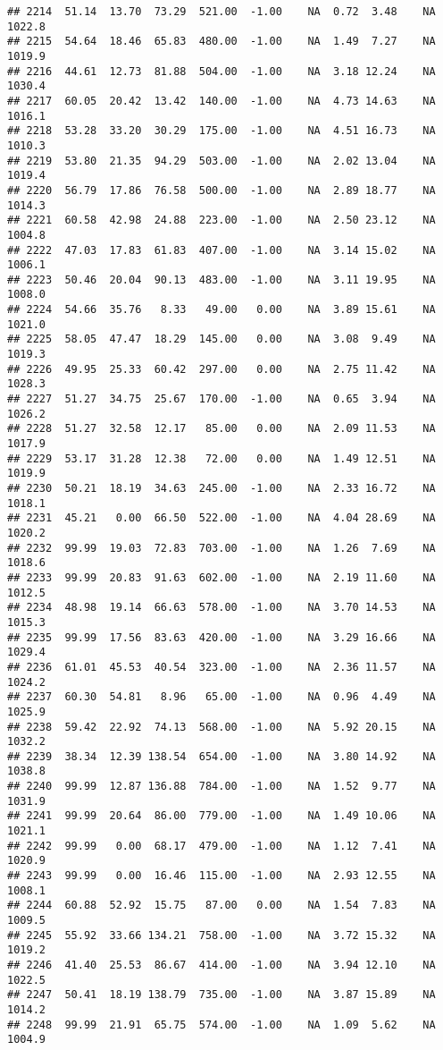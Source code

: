 \documentclass{article}\usepackage{graphicx, color}
\makeatletter
\newenvironment{kframe}{%
 \def\at@end@of@kframe{}%
 \ifinner\ifhmode%
  \def\at@end@of@kframe{\end{minipage}}%
  \begin{minipage}{\columnwidth}%
 \fi\fi%
 \def\FrameCommand##1{\hskip\@totalleftmargin \hskip-\fboxsep
 \colorbox{shadecolor}{##1}\hskip-\fboxsep
     \hskip-\linewidth \hskip-\@totalleftmargin \hskip\columnwidth}%
 \MakeFramed {\advance\hsize-\width
   \@totalleftmargin\z@ \linewidth\hsize
   \@setminipage}}%
 {\par\unskip\endMakeFramed%
 \at@end@of@kframe}
\newenvironment{knitrout}{}{} %
\makeatother
\begin{document}
\begin{knitrout}
\begin{kframe}
\begin{verbatim}
## 2214  51.14  13.70  73.29  521.00  -1.00    NA  0.72  3.48    NA 1022.8
## 2215  54.64  18.46  65.83  480.00  -1.00    NA  1.49  7.27    NA 1019.9
## 2216  44.61  12.73  81.88  504.00  -1.00    NA  3.18 12.24    NA 1030.4
## 2217  60.05  20.42  13.42  140.00  -1.00    NA  4.73 14.63    NA 1016.1
## 2218  53.28  33.20  30.29  175.00  -1.00    NA  4.51 16.73    NA 1010.3
## 2219  53.80  21.35  94.29  503.00  -1.00    NA  2.02 13.04    NA 1019.4
## 2220  56.79  17.86  76.58  500.00  -1.00    NA  2.89 18.77    NA 1014.3
## 2221  60.58  42.98  24.88  223.00  -1.00    NA  2.50 23.12    NA 1004.8
## 2222  47.03  17.83  61.83  407.00  -1.00    NA  3.14 15.02    NA 1006.1
## 2223  50.46  20.04  90.13  483.00  -1.00    NA  3.11 19.95    NA 1008.0
## 2224  54.66  35.76   8.33   49.00   0.00    NA  3.89 15.61    NA 1021.0
## 2225  58.05  47.47  18.29  145.00   0.00    NA  3.08  9.49    NA 1019.3
## 2226  49.95  25.33  60.42  297.00   0.00    NA  2.75 11.42    NA 1028.3
## 2227  51.27  34.75  25.67  170.00  -1.00    NA  0.65  3.94    NA 1026.2
## 2228  51.27  32.58  12.17   85.00   0.00    NA  2.09 11.53    NA 1017.9
## 2229  53.17  31.28  12.38   72.00   0.00    NA  1.49 12.51    NA 1019.9
## 2230  50.21  18.19  34.63  245.00  -1.00    NA  2.33 16.72    NA 1018.1
## 2231  45.21   0.00  66.50  522.00  -1.00    NA  4.04 28.69    NA 1020.2
## 2232  99.99  19.03  72.83  703.00  -1.00    NA  1.26  7.69    NA 1018.6
## 2233  99.99  20.83  91.63  602.00  -1.00    NA  2.19 11.60    NA 1012.5
## 2234  48.98  19.14  66.63  578.00  -1.00    NA  3.70 14.53    NA 1015.3
## 2235  99.99  17.56  83.63  420.00  -1.00    NA  3.29 16.66    NA 1029.4
## 2236  61.01  45.53  40.54  323.00  -1.00    NA  2.36 11.57    NA 1024.2
## 2237  60.30  54.81   8.96   65.00  -1.00    NA  0.96  4.49    NA 1025.9
## 2238  59.42  22.92  74.13  568.00  -1.00    NA  5.92 20.15    NA 1032.2
## 2239  38.34  12.39 138.54  654.00  -1.00    NA  3.80 14.92    NA 1038.8
## 2240  99.99  12.87 136.88  784.00  -1.00    NA  1.52  9.77    NA 1031.9
## 2241  99.99  20.64  86.00  779.00  -1.00    NA  1.49 10.06    NA 1021.1
## 2242  99.99   0.00  68.17  479.00  -1.00    NA  1.12  7.41    NA 1020.9
## 2243  99.99   0.00  16.46  115.00  -1.00    NA  2.93 12.55    NA 1008.1
## 2244  60.88  52.92  15.75   87.00   0.00    NA  1.54  7.83    NA 1009.5
## 2245  55.92  33.66 134.21  758.00  -1.00    NA  3.72 15.32    NA 1019.2
## 2246  41.40  25.53  86.67  414.00  -1.00    NA  3.94 12.10    NA 1022.5
## 2247  50.41  18.19 138.79  735.00  -1.00    NA  3.87 15.89    NA 1014.2
## 2248  99.99  21.91  65.75  574.00  -1.00    NA  1.09  5.62    NA 1004.9

\end{verbatim}
\end{kframe}
\end{knitrout}
\end{document}
